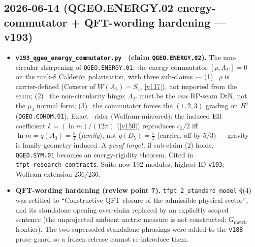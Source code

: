 \subsection*{2026-06-14 (QGEO.ENERGY.02 energy-commutator + QFT-wording hardening --- v193)}
\begin{itemize}
\item \textbf{\texttt{v193\_qgeo\_energy\_commutator.py} \mO\ (claim \texttt{QGEO.ENERGY.02}).} The
  non-circular sharpening of \texttt{QGEO.ENERGY.01}: the energy commutator
  $[\rho,\Lambda_\Sigma]=0$ on the rank-$8$ Calder\'on polarisation, with three sub-claims --- (1) \mE\
  $\rho$ is carrier-defined (Coxeter of $W(A_3){=}S_4$, \vref{v117}), not imported from the seam; (2) \mO\
  the non-circularity hinge: $\Lambda_\Sigma$ must be the \emph{raw} RP-seam DtN, not the $\mu_4$ normal
  form; (3) \mE\ the commutator forces the $(1,2,3)$ grading on $H^1$ (\texttt{QGEO.COHOM.01}). Exact \mE\
  rider (Wolfram-mirrored): the induced EH coefficient $k=(\ln m)/(12\pi)$ (\vref{v150}) reproduces
  $c_3/2$ iff $\ln m=q(A_3)=\tfrac34$ (\emph{family}), not $q(D_5)=\tfrac54$ (carrier, off by $5/3$) ---
  gravity is family-geometry-induced. A \emph{proof target}; if sub-claim (2) holds, \texttt{QGEO.SYM.01}
  becomes an energy-rigidity theorem. Cited in \texttt{tfpt\_research\_contracts}. Suite now 192 modules,
  highest ID \texttt{v193}; Wolfram extension $236/236$.
\item \textbf{QFT-wording hardening (review point 7).} \texttt{tfpt\_2\_standard\_model} \S(4) was
  retitled to ``Constructive QFT closure of the admissible physical sector'', and its standalone
  opening over-claim replaced by an explicitly scoped sentence (the unprojected ambient metric measure is
  not constructed; $G_{\mathrm{metric}}$ frontier). The two superseded standalone phrasings were added to
  the \texttt{v188} prose guard so a frozen release cannot re-introduce them.
\end{itemize}

